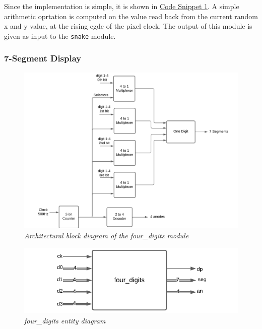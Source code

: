 \documentclass[aps, secnumarabic, balancelastpage, asmath, amssymb, nofootinbib, floatfix,]{revtex4-2}
\begin{document}
{Since the implementation is simple, it is shown in \hyperref[code:1]{Code Snippet 1}. A simple arithmetic oprtation is computed on the value read back from the current random x and y value, at the rising egde of the pixel clock. The output of this module is given as input to the \verb|snake| module.

\vspace{-1.5em}
\subsubsection{\fontsize{10pt}{12pt}\selectfont \bf 7-Segment Display \label{sec:2.2.4}}

\begin{figure}[h]
  \centering
  \includegraphics[scale = 0.69]{four_digits.pdf}
  \caption{\em Architectural block diagram of the four\_digits module}
  \label{fig:7}
\end{figure}

\clearpage

\begin{figure}
  \centering
  \includegraphics[scale = 0.8]{four_digit_block.pdf}
  \caption{\em four\_digits entity diagram}
  \label{fig:8}
\end{figure}

}
\end{document}
